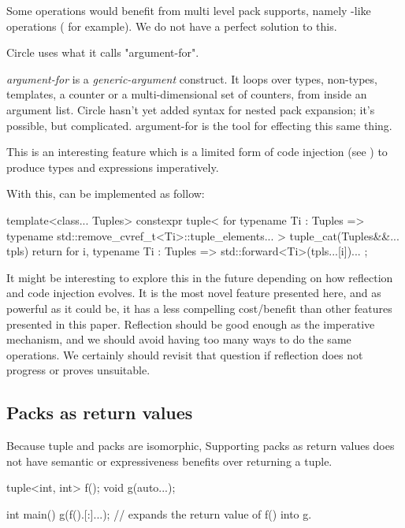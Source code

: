 \documentclass{wg21}
\begin{document}
Some operations would benefit from multi level pack supports, namely -like operations ( for example).
We do not have a perfect solution to this.

Circle uses what it calls "argument-for".

\begin{quoteblock}
\emph{argument-for} is a  \emph{generic-argument} construct. It loops over types, non-types, templates, a counter or a multi-dimensional set of counters, from inside an argument list. Circle hasn't yet added syntax for nested pack expansion; it's possible, but complicated. argument-for is the tool for effecting this same thing.
\end{quoteblock}

This is an interesting feature which is a limited form of code injection (see ) to produce types and expressions imperatively.

With this,  can be implemented as follow:

\begin{colorblock}
    template<class... Tuples>
    constexpr tuple<
    for typename Ti : Tuples =>
        typename std::remove_cvref_t<Ti>::tuple_elements...
    >
    tuple_cat(Tuples&&... tpls) {
        return {
            for i, typename Ti : Tuples => std::forward<Ti>(tpls...[i])...
        };
    }
\end{colorblock}

It might be interesting to explore this in the future depending on how reflection and code injection evolves.
It is the most novel feature presented here, and as powerful as it could be, it has a less compelling cost/benefit than other features presented in this paper.
Reflection should be good enough as the imperative mechanism, and we should avoid having too many ways to do the same operations.
We certainly should revisit that question if reflection does not progress or proves unsuitable.

\subsection{Packs as return values}

Because tuple and packs are isomorphic, Supporting packs as return values does not have semantic or expressiveness benefits over returning a tuple.

\begin{colorblock}
tuple<int, int> f();
void g(auto...);

int main() {
    g(f().[:]...); // expands the return value of f() into g.
}
\end{colorblock}
\end{document}
